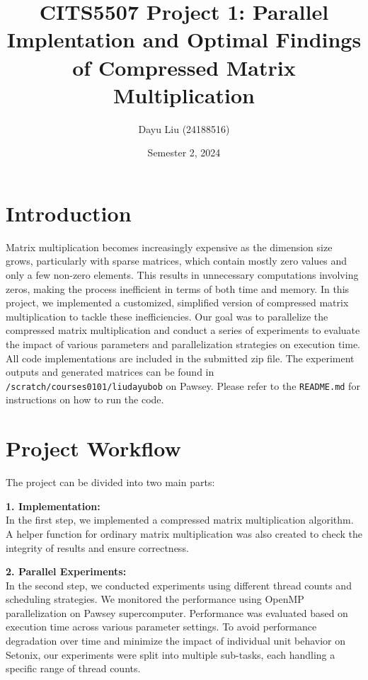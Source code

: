 \documentclass[
]{article}
\title{CITS5507 Project 1: Parallel Implentation and Optimal Findings of
Compressed Matrix Multiplication}
\author{Dayu Liu (24188516)}
\date{Semester 2, 2024}
\begin{document}
\maketitle

\section{Introduction}\label{introduction}

Matrix multiplication becomes increasingly expensive as the dimension
size grows, particularly with sparse matrices, which contain mostly zero
values and only a few non-zero elements. This results in unnecessary
computations involving zeros, making the process inefficient in terms of
both time and memory. In this project, we implemented a customized,
simplified version of compressed matrix multiplication to tackle these
inefficiencies. Our goal was to parallelize the compressed matrix
multiplication and conduct a series of experiments to evaluate the
impact of various parameters and parallelization strategies on execution
time. All code implementations are included in the submitted zip file.
The experiment outputs and generated matrices can be found in
\texttt{/scratch/courses0101/liudayubob} on Pawsey. Please refer to the
\texttt{README.md} for instructions on how to run the code.
\vspace{0.5cm}

\section{Project Workflow}\label{project-workflow}

The project can be divided into two main parts:

\textbf{1. Implementation:}\\
In the first step, we implemented a compressed matrix multiplication
algorithm. A helper function for ordinary matrix multiplication was also
created to check the integrity of results and ensure correctness.

\textbf{2. Parallel Experiments:}\\
In the second step, we conducted experiments using different thread
counts and scheduling strategies. We monitored the performance using
OpenMP parallelization on Pawsey supercomputer. Performance was
evaluated based on execution time across various parameter settings. To
avoid performance degradation over time and minimize the impact of
individual unit behavior on Setonix, our experiments were split into
multiple sub-tasks, each handling a specific range of thread counts.
\end{document}
